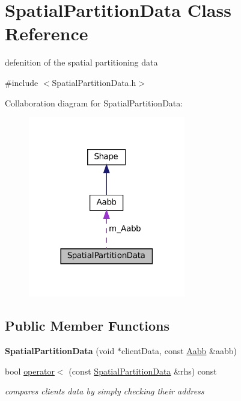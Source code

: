 \hypertarget{classSpatialPartitionData}{}\section{Spatial\+Partition\+Data Class Reference}
\label{classSpatialPartitionData}


defenition of the spatial partitioning data  




{\ttfamily \#include $<$Spatial\+Partition\+Data.\+h$>$}



Collaboration diagram for Spatial\+Partition\+Data\+:
\nopagebreak
\begin{figure}[H]
\begin{center}
\leavevmode
\includegraphics[width=194pt]{classSpatialPartitionData__coll__graph}
\end{center}
\end{figure}
\subsection*{Public Member Functions}
\begin{DoxyCompactItemize}
\item 
\mbox{\label{classSpatialPartitionData_ae68774df30d93ce8d2b5d51fb4d78bbc}} 
{\bfseries Spatial\+Partition\+Data} (void $\ast$client\+Data, const \hyperlink{classAabb}{Aabb} \&aabb)
\item 
bool \hyperlink{classSpatialPartitionData_adcebf770064b351b8db5e5d792059a0e}{operator$<$} (const \hyperlink{classSpatialPartitionData}{Spatial\+Partition\+Data} \&rhs) const
\begin{DoxyCompactList}\small\item\em compares clients data by simply checking their address \end{DoxyCompactList}\end{DoxyCompactItemize}
